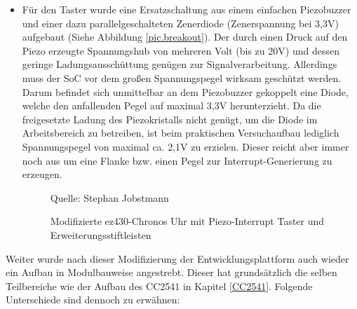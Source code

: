 \documentclass[12pt]{scrreprt} %
\begin{document}
\begin{itemize}
\item
Für den Taster wurde eine Ersatzschaltung aus einem einfachen Piezobuzzer und einer dazu parallelgeschalteten Zenerdiode (Zenerspannung bei 3,3V) aufgebaut (Siehe Abbildung \vref{pic.breakout}). Der durch einen Druck auf den Piezo erzeugte Spannungshub von mehreren Volt (bis zu 20V) und dessen geringe Ladungsausschüttung genügen zur Signalverarbeitung. Allerdings muss der SoC vor dem großen Spannungspegel wirksam geschützt werden. Darum befindet sich unmittelbar an dem Piezobuzzer gekoppelt eine Diode, welche den anfallenden Pegel auf maximal 3,3V herunterzieht. Da die freigesetzte Ladung des Piezokristalls nicht genügt, um die Diode im Arbeitsbereich zu betreiben, ist beim praktischen Versuchaufbau lediglich Spannungspegel von maximal ca. 2,1V zu erzielen. Dieser reicht aber immer noch aus um eine Flanke bzw. einen Pegel zur Interrupt-Generierung zu erzeugen. 
\begin{figure}
\centering
\caption[Modifizierte ez430-Chronos Uhr]{Modifizierte ez430-Chronos Uhr mit Piezo-Interrupt Taster und Erweiterungsstiftleisten}
Quelle: Stephan Jobstmann
\label{pic.breakout}
\end{figure}
\end{itemize}
Weiter wurde nach dieser Modifizierung der Entwicklungsplattform auch wieder ein Aufbau in Modulbauweise angestrebt. Dieser hat grundsätzlich die selben Teilbereiche wie der Aufbau des CC2541 in Kapitel \vref{CC2541}. Folgende Unterschiede sind dennoch zu erwähnen:
\end{document}
